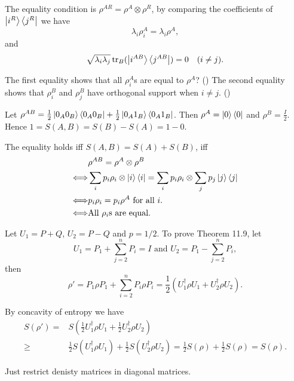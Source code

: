 The equality condition is $\rho^{AR} = \rho^A \otimes \rho^R$, by comparing the coefficients of $\left|i^R\right\rangle\left\langle j^R\right|$ we have
$$
\lambda_i\rho_i^A = \lambda_i\rho^A,
$$
and
$$
\sqrt{\lambda_i\lambda_j}\operatorname{tr}_B(\left|i^{AB}\right\rangle\left\langle j^{AB}\right|)=0 \quad(i\neq j).
$$

The first equality shows that all $\rho_i^A$s are equal to $\rho^A$? (\todo)
The second equality shows that $\rho_i^B$ and $\rho_j^B$ have orthogonal support when $i\neq j$. (\todo)

\ex Let $\rho^{AB} = \frac{1}{2}\left|0_A0_B\right\rangle\left\langle0_A0_B\right| + \frac{1}{2}\left|0_A1_B\right\rangle\left\langle0_A1_B\right|$.
Then $\rho^A = \left|0\right\rangle\left\langle0\right|$ and $\rho^B = \frac{I}{2}$.
Hence $1 = S(A, B) = S(B) - S(A) = 1 - 0$.

\ex The equality holds iff $S(A,B)=S(A)+S(B)$, iff
$$\begin{aligned}
    & \rho^{AB} = \rho^A \otimes \rho^B
    \\ \Longleftrightarrow & \sum_i p_i\rho_i \otimes \left|i\right\rangle\left\langle i\right| = \sum_i p_i\rho_i \otimes \sum_j p_j\left|j\right\rangle\left\langle j\right|
    \\ \Longleftrightarrow & p_i\rho_i = p_i\rho^A\text{ for all }i.
    \\ \Longleftrightarrow & \text{All }\rho_i\text{s are equal.}
\end{aligned}$$

\ex \todo

\ex Let $U_1=P+Q$, $U_2=P-Q$ and $p=1/2$.
To prove Theorem 11.9, let
$$
U_1 = P_1 + \sum_{j=2}^nP_i = I
\text{ and }
U_2 = P_1 - \sum_{j=2}^nP_i,
$$
then
$$
\rho'
= P_1\rho P_1 + \sum_{i=2}^n P_i\rho P_i
= \frac{1}{2}(U_1^\dagger\rho U_1 + U_2^\dagger\rho U_2).
$$

By concavity of entropy we have
$$\begin{aligned}
S(\rho') = & S(\frac{1}{2}U_1^\dagger\rho U_1 + \frac{1}{2}U_2^\dagger\rho U_2)
\\ \ge & \frac{1}{2}S(U_1^\dagger\rho U_1) + \frac{1}{2}S(U_2^\dagger\rho U_2) = \frac{1}{2}S(\rho) + \frac{1}{2}S(\rho) = S(\rho).
\end{aligned}$$

\ex Just restrict denisty matrices in diagonal matrices.

